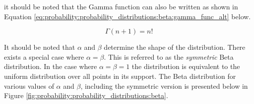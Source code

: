 it should be noted that the Gamma function can also be written as shown in Equation \ref{eq:probability:probability_distributions:beta:gamma_func_alt} below.

\begin{equation}
      \label{eq:probability:probability_distributions:beta:gamma_func_alt}
      \Gamma(n+1) = n!
\end{equation}

It should be noted that $\alpha$ and $\beta$ determine the shape of the distribution. There exists a special case where $\alpha = \beta$. This is referred to as the \textit{symmetric} Beta distribution. In the case where $\alpha = \beta = 1$ the distribution is equivalent to the uniform distribution over all points in its support. The Beta distribution for various values of $\alpha$ and $\beta$, including the symmetric version is presented below in Figure \ref{fig:probability:probability_distributions:beta}.


